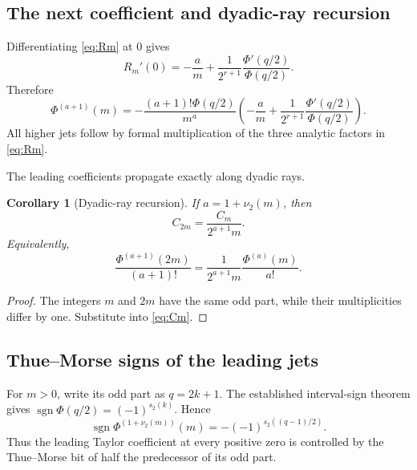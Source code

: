 \documentclass[11pt,oneside]{article}
\numberwithin{equation}{section}
\theoremstyle{plain}
\newtheorem{corollary}[theorem]{Corollary}
\theoremstyle{definition}
\theoremstyle{remark}
\newcommand{\sgn}{\operatorname{sgn}}
\begin{document}
\subsection{The next coefficient and dyadic-ray recursion}

Differentiating \cref{eq:Rm} at $0$ gives
\begin{equation}\label{eq:Rprime}
 R_m'(0)=-\frac{a}{m}
 +\frac1{2^{r+1}}\frac{\Phi'(q/2)}{\Phi(q/2)}.
\end{equation}
Therefore
\begin{equation}\label{eq:next-jet}
 \Phi^{(a+1)}(m)
 =-\frac{(a+1)!\Phi(q/2)}{m^a}
 \left(-\frac{a}{m}
 +\frac1{2^{r+1}}\frac{\Phi'(q/2)}{\Phi(q/2)}\right).
\end{equation}
All higher jets follow by formal multiplication of the three analytic factors in \cref{eq:Rm}.

The leading coefficients propagate exactly along dyadic rays.

\begin{corollary}[Dyadic-ray recursion]\label{cor:dyadic-ray}
If $a=1+\nu_2(m)$, then
\begin{equation}\label{eq:C-ray}
 C_{2m}=\frac{C_m}{2^{a+1}m}.
\end{equation}
Equivalently,
\begin{equation}\label{eq:der-ray}
 \frac{\Phi^{(a+1)}(2m)}{(a+1)!}
 =\frac1{2^{a+1}m}\frac{\Phi^{(a)}(m)}{a!}.
\end{equation}
\end{corollary}

\begin{proof}
The integers $m$ and $2m$ have the same odd part, while their multiplicities differ by one.  Substitute into \cref{eq:Cm}.
\end{proof}

\subsection{Thue--Morse signs of the leading jets}

For $m>0$, write its odd part as $q=2k+1$.  The established interval-sign theorem gives $\sgn\Phi(q/2)=(-1)^{s_2(k)}$.  Hence
\begin{equation}\label{eq:jet-sign}
 \boxed{\ \sgn\Phi^{(1+\nu_2(m))}(m)
 =-(-1)^{s_2((q-1)/2)}.\ }
\end{equation}
Thus the leading Taylor coefficient at every positive zero is controlled by the Thue--Morse bit of half the predecessor of its odd part.
\end{document}
